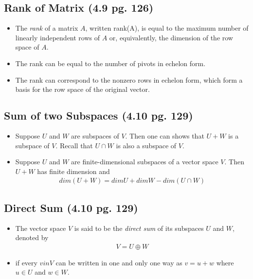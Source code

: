 \documentclass[hidelinks, 11pt, openleft]{scrartcl}
\begin{document}
    \subsection*{Rank of Matrix (4.9 pg. 126)}
    \begin{itemize}
        \item The \textit{rank} of a matrix $A$, written rank(A), is equal to the maximum number of linearly independent rows of $A$ or, equivalently, the dimension of the row space of $A$.
        \item The rank can be equal to the number of pivots in echelon form.
        \item The rank can correspond to the nonzero rows in echelon form, which form a basis for the row space of the original vector.
    \end{itemize}
    
    \subsection*{Sum of two Subspaces (4.10 pg. 129)}
    \begin{itemize}
        \item Suppose $U$ and $W$ are subspaces of $V$. Then one can shows that $U+W$ is a subspace of $V$. Recall that $U \cap W$ is also a subspace of $V$. 
        \item Suppose $U$ and $W$ are finite-dimensional subspaces of a vector space $V$. Then $U+W$ has finite dimension and
            \begin{align*}
                dim(U+W) = dimU + dimW - dim(U \cap W)
            \end{align*}
    \end{itemize}
    
    \subsection*{Direct Sum (4.10 pg. 129)}
    \begin{itemize}
        \item The vector space $V$ is said to be the \textit{direct sum} of its subspaces $U$ and $W$, denoted by
        \begin{align*}
            V=U \oplus W
        \end{align*}
        \item if every $v in V$ can be written in one and only one way as $v=u+w$ where $u \in U$ and $w \in W$.
    \end{itemize}
    
\end{document}
